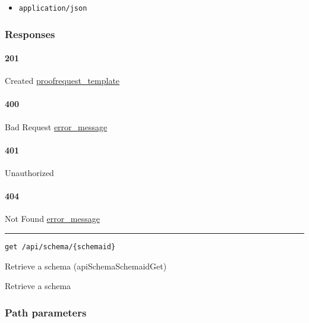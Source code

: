 \begin{itemize}
\tightlist
\item
  \texttt{application/json}
\end{itemize}

\hypertarget{responses-177}{%
\subsubsection{Responses}\label{responses-177}}

\hypertarget{section-569}{%
\paragraph{201}\label{section-569}}

Created
\protect\hyperlink{proofrequest_template}{proofrequest\_template}

\hypertarget{section-570}{%
\paragraph{400}\label{section-570}}

Bad Request \protect\hyperlink{error_message}{error\_message}

\hypertarget{section-571}{%
\paragraph{401}\label{section-571}}

Unauthorized \protect\hyperlink{}{}

\hypertarget{section-572}{%
\paragraph{404}\label{section-572}}

Not Found \protect\hyperlink{error_message}{error\_message}

\begin{center}\rule{0.5\linewidth}{\linethickness}\end{center}

\protect\hypertarget{apiSchemaSchemaidGet}{}{}

\begin{verbatim}
get /api/schema/{schemaid}
\end{verbatim}

Retrieve a schema ({apiSchemaSchemaidGet})

Retrieve a schema

\hypertarget{path-parameters-96}{%
\subsubsection{Path parameters}\label{path-parameters-96}}


